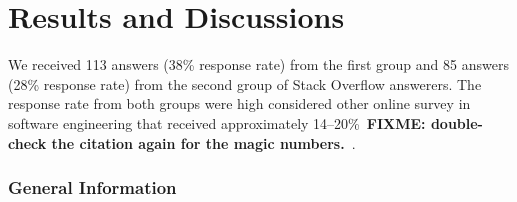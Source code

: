 \documentclass{svjour3}                     %
\newcommand\FIXME[1]{\textbf{FIXME: #1}}
\begin{document}
\section{Results and Discussions}

We received 113 answers (38\% response rate) from the first group and 85 answers
(28\% response rate) from the second group of Stack Overflow answerers. The response
rate from both groups were high considered other online survey in software
engineering that received approximately 14--20\%~\FIXME{double-check the
	citation again for the magic numbers.}~\citep{Punter2003}.

\subsubsection*{General Information}

\end{document}
